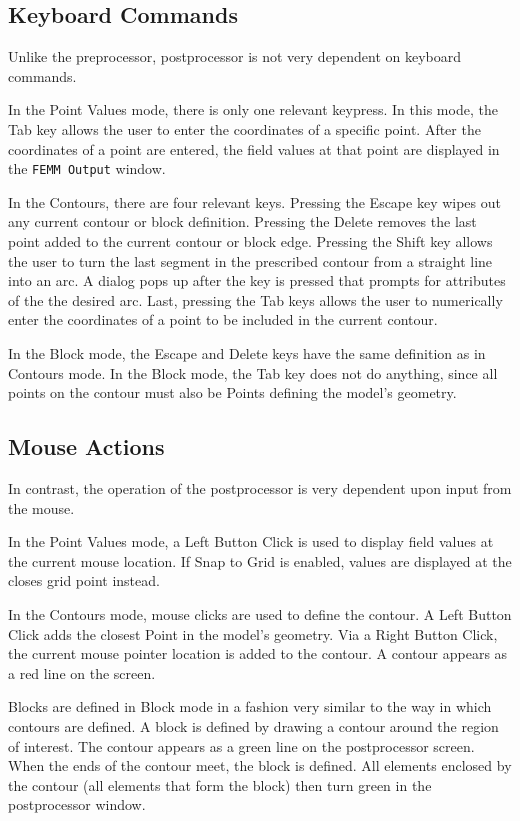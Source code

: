 \documentclass[12pt]{report}
\begin{document}
\subsection{Keyboard Commands}

Unlike the preprocessor, postprocessor is not very dependent on
keyboard commands.

In the Point Values mode, there is only one relevant keypress. In
this mode, the Tab key allows the user to enter the coordinates of
a specific point.  After the coordinates of a point are entered,
the field values at that point are displayed in the {\tt FEMM
Output} window.

In the Contours, there are four relevant keys. Pressing the Escape
key wipes out any current contour or block definition. Pressing the
Delete removes the last point added to the current contour or block
edge.  Pressing the Shift key allows the user to turn the last segment
in the prescribed contour from a straight line into an arc.  A dialog
pops up after the key is pressed that prompts for attributes of the
the desired arc. Last, pressing the Tab keys allows the user to numerically
enter the coordinates of a point to be included in the current
contour.

In the Block mode, the Escape and Delete keys have the same
definition as in Contours mode.  In the Block mode, the Tab key
does not do anything, since all points on the contour must also be
Points defining the model's geometry.

\subsection{Mouse Actions}

In contrast, the operation of the postprocessor is very dependent
upon input from the mouse.

In the Point Values mode, a Left Button Click is used to display
field values at the current mouse location.  If Snap to Grid is
enabled, values are displayed at the closes grid point instead.

In the Contours mode, mouse clicks are used to define the contour.
A Left Button Click adds the closest Point in the model's geometry.
Via a Right Button Click, the current mouse pointer location is
added to the contour.  A contour appears as a red line on the
screen.

Blocks are defined in Block mode in a fashion very similar to the
way in which contours are defined.  A block is defined by
drawing a contour around the region of interest.  The contour
appears as a green line on the postprocessor screen.  When the ends
of the contour meet, the block is defined.  All elements enclosed
by the contour (all elements that form the block) then turn green
in the postprocessor window.
\end{document}
